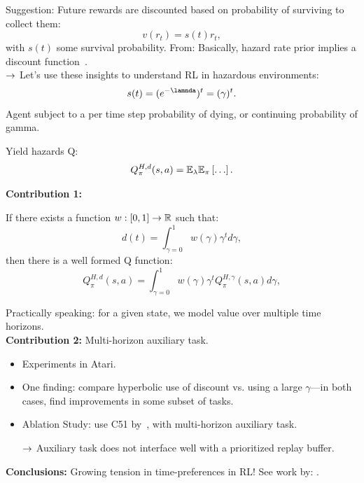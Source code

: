 Suggestion: Future rewards are discounted based on probability of surviving to collect them: 
\[
v(r_t) = s(t) r_t,
\]
with $s(t)$ some survival probability. From:
Basically, hazard rate prior implies a discount function~\cite{sozou1998hyperbolic}. \\

$\rightarrow$ Let's use these insights to understand RL in hazardous environments:
\[
s(t) = (e^{-\lamnda})^t = (\gamma)^t.
\]
Agent subject to a per time step probability of dying, or continuing probability of gamma. \\


Yield hazards Q:
\[
Q_\pi^{H,d}(s,a) = \mathbb{E}_\lambda \mathbb{E}_\pi\left[ \ldots \right].
\]

{\bf Contribution 1:}
\begin{lemma}
If there exists a function $w : [0,1] \rightarrow \mathbb{R}$ such that:
\[
d(t) = \int_{\gamma=0}^1 w(\gamma) \gamma^t d\gamma, 
\]
then there is a well formed Q function:
\[
Q_\pi^{H,d}(s,a) = \int_{\gamma=0}^1 w(\gamma) \gamma^t Q_\pi^{H,\gamma}(s,a) d\gamma, 
\]
\end{lemma}

Practically speaking: for a given state, we model value over multiple time horizons. \\

{\bf Contribution 2:} Multi-horizon auxiliary task. \\
\begin{itemize}
    \item Experiments in Atari.
    \item One finding: compare hyperbolic use of discount vs. using a large $\gamma$---in both cases, find improvements in some subset of tasks.
    \item Ablation Study: use C51 by~\citet{bellemare2017distributional}, with multi-horizon auxiliary task.
    
    $\rightarrow$ Auxiliary task does not interface well with a prioritized replay buffer. 
    
\end{itemize}

{\bf Conclusions:} Growing tension in time-preferences in RL! See work by: \citet{pitis2019rethinking,white2017unifying}.

